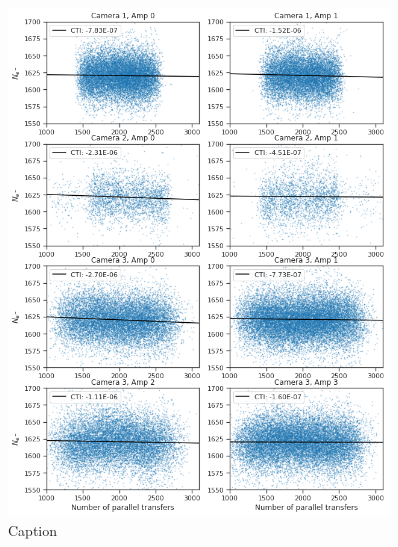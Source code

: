 \begin{figure}
    \centering
    \includegraphics[width=0.9\textwidth]{figures/cte/xray_cte_parallel.png}
    \caption{Caption}
    \label{fig:cte_xray}
\end{figure}

